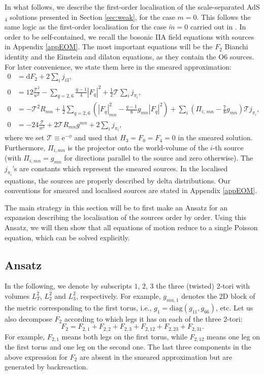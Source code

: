 \documentclass[11pt]{article}
\renewcommand{\[}{\left[}
\renewcommand{\]}{\right]}
\renewcommand{\(}{\left(}
\renewcommand{\)}{\right)}
\renewcommand{\d}{\textrm{d}}
\newcommand{\e}{\textrm{e}}
\newcommand{\<}{\langle}
\renewcommand{\>}{\rangle}
\begin{document}
In what follows, we describe the first-order localisation of the scale-separated AdS$_4$ solutions presented in Section \ref{sec:weak}, for the case $m=0$. This follows the same logic as the first-order localisation for the case $\tilde{m}=0$ carried out in \cite{Junghans:2020acz}. In order to be self-contained, we recall the bosonic IIA field equations with sources in Appendix \ref{appEOM}.
The most important equations will be the $F_2$ Bianchi identity and the Einstein and dilaton equations, as they contain the O6 sources. For later convenience, we state them here in the smeared approximation:
\begin{align}
0 & = \d F_2 + 2 \sum_i j_{i3}, \label{eq:smear0} \\
\label{eq:smear1}
    0 & = 12 \frac{\mathcal{T}^2}{w^2} - \sum_{q=2,6} \frac{q-1}{4}|F_q|^2+\frac12 \mathcal{T}\sum_i j_{\pi_i}, \\
    \label{eq:smear2}
    0 &=-\mathcal{T}^2 R_{mn} + \frac12 \sum_{q=2,6} \left(|F_q|^2_{mn} - \frac{q-1}{8}g_{mn}|F_q|^2\right) + \sum_i \left(\Pi_{i, \, mn} - \frac78 g_{mn}\right)\mathcal{T} j_{\pi_i},\\
    \label{eq:smear3}
    0&= -24 \frac{\mathcal{T}}{w^2} + 2 \mathcal{T}R_{mn}g^{mn} + 2 \sum_i j_{\pi_i},
\end{align}
where we set $\mathcal{T} \equiv \e^{-\phi}$ and used that $H_3=F_0=F_4=0$ in the smeared solution. Furthermore, $\Pi_{i,mn}$ is the projector onto the world-volume of the $i$-th source (with $\Pi_{i,mn}=g_{mn}$ for directions parallel to the source and zero otherwise). The $j_{\pi_i}$'s are constants which represent the smeared sources. In the localised equations, the sources are properly described by delta distributions. Our conventions for smeared and localised sources are stated in Appendix \ref{appEOM}.

The main strategy in this section will be to first make an Ansatz for an expansion describing the localisation of the sources order by order. Using this Ansatz, we will then show that all equations of motion reduce to a single Poisson equation, which can  be solved explicitly.


\subsection{Ansatz}
\label{sec:ansatz}

In the following, we denote by subscripts $1$, $2$, $3$ the three (twisted) 2-tori with volumes $L_T^2$, $L_2^2$ and $L_3^2$, respectively. For example, $g_{mn,1}$ denotes the 2D block of the metric corresponding to the first torus, i.e., $g_{1}= \text{diag}(g_{11},g_{66})$, etc. Let us also decompose $F_2$ according to which legs it has on each of the three 2-tori:
\begin{equation}
F_2 = F_{2,1}+ F_{2,2}+ F_{2,3} + F_{2,12}+ F_{2,23}+
F_{2,31}.
\end{equation}
For example, $F_{2,1}$ means both legs on the first torus, while $F_{2,12}$ means one leg on the first torus and one leg on the second one. The last three components in the above expression for $F_2$ are absent in the smeared approximation but are generated by backreaction.
\end{document}
